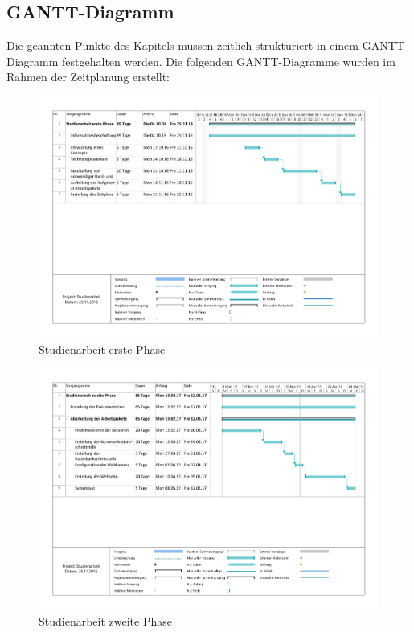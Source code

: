 \subsection{GANTT-Diagramm}
Die geannten Punkte des Kapitels  müssen zeitlich strukturiert in einem GANTT-Diagramm festgehalten werden.
Die folgenden GANTT-Diagramme wurden im Rahmen der Zeitplanung erstellt:
\begin{landscape}
	\begin{figure}[h]
		\includegraphics[width=\linewidth, height=.9\textheight]{Bilder/GANTT/Studienarbeit_erste_Phase.pdf}
		\caption[Studienarbeit erste Phase]{Studienarbeit erste Phase}
		\label{fig:Studienarbeit_erste_Phase}
	\end{figure}
\end{landscape}
\begin{landscape}
	\begin{figure}[h]
		\includegraphics[width=\linewidth, height=.9\textheight]{Bilder/GANTT/Studienarbeit_zweite_Phase.pdf}
		\caption[Studienarbeit zweite Phase]{Studienarbeit zweite Phase}
		\label{fig:Studienarbeit_zweite_Phase}
	\end{figure}
\end{landscape}


